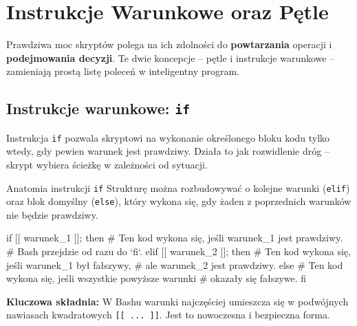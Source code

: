 \section{Instrukcje Warunkowe oraz Pętle}
Prawdziwa moc skryptów polega na ich zdolności do \textbf{powtarzania} operacji i \textbf{podejmowania decyzji}. Te dwie koncepcje -- pętle i instrukcje warunkowe -- zamieniają prostą listę poleceń w inteligentny program.

\subsection{Instrukcje warunkowe: \texttt{if}}
Instrukcja \texttt{if} pozwala skryptowi na wykonanie określonego bloku kodu tylko wtedy, gdy pewien warunek jest prawdziwy. Działa to jak rozwidlenie dróg -- skrypt wybiera ścieżkę w zależności od sytuacji.

\begin{definitionbox}{Anatomia instrukcji \texttt{if}}
Strukturę można rozbudowywać o kolejne warunki (\texttt{elif}) oraz blok domyślny (\texttt{else}), który wykona się, gdy żaden z poprzednich warunków nie będzie prawdziwy.
\begin{terminal}
if [[ warunek_1 ]]; then
    # Ten kod wykona się, jeśli warunek_1 jest prawdziwy.
    # Bash przejdzie od razu do `fi`.
elif [[ warunek_2 ]]; then
    # Ten kod wykona się, jeśli warunek_1 był fałszywy,
    # ale warunek_2 jest prawdziwy.
else
    # Ten kod wykona się, jeśli wszystkie powyższe warunki
    # okazały się fałszywe.
fi
\end{terminal}
\textbf{Kluczowa składnia:} W Bashu warunki najczęściej umieszcza się w podwójnych nawiasach kwadratowych \texttt{[[ ... ]]}. Jest to nowoczesna i bezpieczna forma.
\end{definitionbox}


